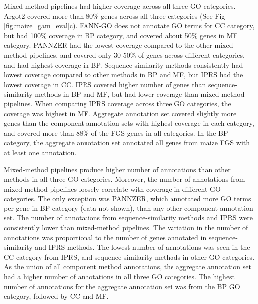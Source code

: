 Mixed-method pipelines had higher coverage across all three GO categories. Argot2 covered more than 80\% genes across all three categories (See Fig \ref{fig:maize_gam_eval}c). FANN-GO does not annotate GO terms for CC category, but had 100\% coverage in BP category, and covered about 50\% genes in MF category. PANNZER had the lowest coverage compared to the other mixed-method pipelines, and covered only 30-50\% of genes across different categories, and had highest coverage in BP. Sequence-similarity methods consistently had lowest coverage compared to other methods in BP and MF, but IPRS had the lowest coverage in CC. IPRS covered higher number of genes than sequence-similarity methods in BP and MF, but had lower coverage than mixed-method pipelines. When comparing IPRS coverage across three GO categories, the coverage was highest in MF.  Aggregate annotation set covered slightly more genes than the component annotation sets with highest coverage in each category, and covered more than 88\% of the FGS genes in all categories. In the BP category, the aggregate annotation set annotated all genes from maize FGS with at least one annotation.

Mixed-method pipelines produce higher number of annotations than other methods in all three GO categories. Moreover, the number of annotations from mixed-method pipelines loosely correlate with coverage in different GO categories. The only exception was PANNZER, which annotated more GO terms per gene in BP category (data not shown), than any other component annotation set. The number of annotations from sequence-similarity methods and IPRS were consistently lower than mixed-method pipelines. The variation in the number of annotations was proportional to the number of genes annotated in sequence-similarity and IPRS methods. The lowest number of annotations was seen in the CC category from IPRS, and sequence-similarity methods in other GO categories. As the union of all component method annotations, the aggregate annotation set had a higher number of annotations in all three GO categories. The highest number of annotations for the aggregate annotation set was from the BP GO category, followed by CC and MF.

